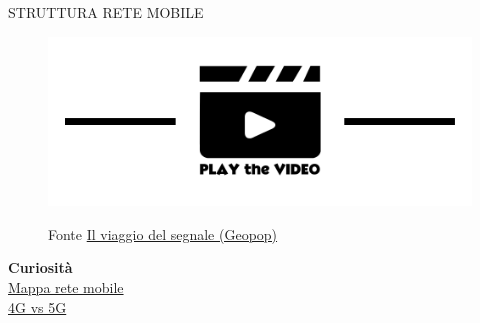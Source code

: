 \documentclass[aspectratio=1610]{beamer}
\begin{document}
\begin{frame}{STRUTTURA RETE MOBILE}
    \begin{figure}
        \href{https://www.geopop.it/il-percorso-del-segnale-del-telefono-quando-chiamiamo-o-inviamo-messaggi/}{\includegraphics[width=\linewidth]{img/play.png}}
        \caption{{Fonte \href{https://www.geopop.it/il-percorso-del-segnale-del-telefono-quando-chiamiamo-o-inviamo-messaggi/}{Il viaggio del segnale (Geopop)}}}
    \end{figure}        
    \bigskip
    \tiny{\textbf{Curiosità}}\\
    \tiny{
        \href{https://geo.agcom.it/agcomapps/BB4/BB4_BBmobile_app17_1/}{Mappa rete mobile}\\
        \href{https://www.geopop.it/5g-vs-4g-quali-sono-le-differenze-e-i-vantaggi-della-nuova-generazione/}{4G vs 5G}
    } 
\end{frame}
\end{document}
